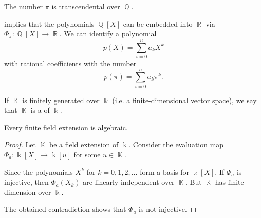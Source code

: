 \begin{theorem}[Pi is transcendental]\label{thm:pi_is_transcendental}
  The number \hyperref[def:pi]{\( \pi \)} is \hyperref[def:transcendetal_element]{transcendental} over \( \BbbQ \).
\end{theorem}

\begin{example}\label{ex:polynomials_over_pi}
   implies that the polynomials \( \BbbQ[X] \) can be embedded into \( \BbbR \) via \( \Phi_\pi: \BbbQ[X] \to \BbbR \). We can identify a polynomial
  \begin{equation*}
    p(X) = \sum_{i=0}^n a_k X^k
  \end{equation*}
  with rational coefficients with the number
  \begin{equation*}
    p(\pi) = \sum_{i=0}^n a_k \pi^k.
  \end{equation*}
\end{example}

\begin{definition}\label{def:finite_field_extension}
  If \( \BbbK \) is \hyperref[def:module_presentation]{finitely generated} over \( \Bbbk \) (i.e. a finite-dimensional \hyperref[def:vector_space]{vector space}), we say that \( \BbbK \) is a  of \( \Bbbk \).
\end{definition}

\begin{lemma}\label{thm:finite_field_extensions_are_algebraic}
  Every \hyperref[def:finite_field_extension]{finite field extension} is \hyperref[def:transcendetal_element]{algebraic}.
\end{lemma}
\begin{proof}
  Let \( \BbbK \) be a field extension of \( \Bbbk \). Consider the evaluation map \( \Phi_a: \Bbbk[X] \to \Bbbk[u] \) for some \( u \in \BbbK \).

  Since the polynomials \( X^k \) for \( k = 0, 1, 2, \ldots \) form a basis for \( \Bbbk[X] \). If \( \Phi_a \) is injective, then \( \Phi_a(X_k) \) are linearly independent over \( \BbbK \). But \( \BbbK \) has finite dimension over \( \Bbbk \).

  The obtained contradiction shows that \( \Phi_a \) is not injective.
\end{proof}

